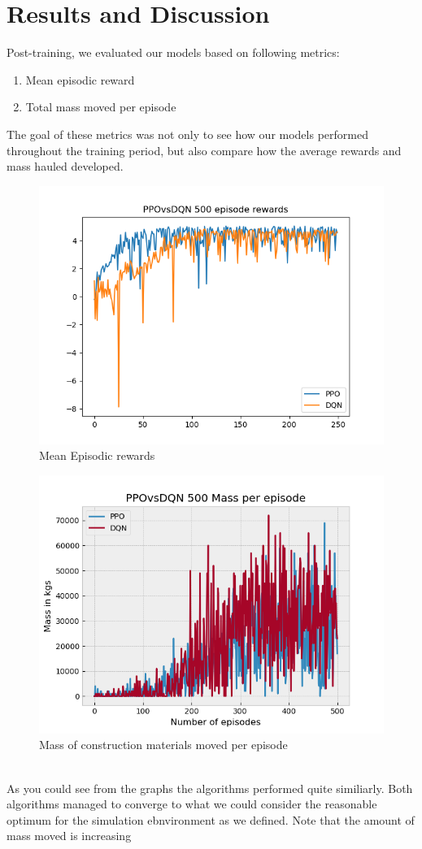 \documentclass[conference]{IEEEtran}
\begin{document}
\section{Results and Discussion}
Post-training, we evaluated our models based on following metrics:
\begin{enumerate}
	\item Mean episodic reward
	\item Total mass moved per episode
\end{enumerate}
The goal of these metrics was not only to see how our models performed throughout the training period, but also compare how the average rewards and mass hauled developed.
\begin{figure}[h!]
	\includegraphics[width=\columnwidth]{graphs/PPOvsDQN250.png}
	\caption{Mean Episodic rewards}
\end{figure}
\begin{figure}[h!]
	\includegraphics[width=\columnwidth]{graphs/PPOvsDQN500mass.png}
	\caption{Mass of construction materials moved per episode}
\end{figure}
\\
As you could see from the graphs the algorithms performed quite similiarly.
Both algorithms managed to converge to what we could consider the reasonable optimum for the simulation ebnvironment as we defined. Note that the amount of mass moved is increasing
\end{document}
